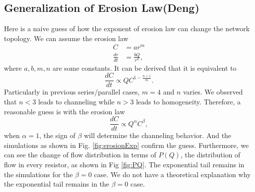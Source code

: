 \subsection{Generalization of Erosion Law(Deng)}
Here is a naive guess of how the exponent of erosion law can change the network topology. We can assume the erosion law  
\begin{align}
    C &= a r^m \\
    \frac{dr}{dt} &= \frac{b Q}{r^n},
\end{align}
where $a,b,m,n$ are some constants. It can be derived that it is equivalent to
\begin{equation}
    \frac{dC}{dt} \propto QC^{1-\frac{n+1}{m}}.
\end{equation}
Particularly in previous series/parallel cases, $m=4$ and $n$ varies. We observed that $n<3$ leads to channeling while $n>3$ leads to homogeneity. Therefore, a reasonable guess is with the erosion law 
\begin{equation}
    \frac{dC}{dt} \propto Q^\alpha C^\beta,
\end{equation}
when $\alpha = 1$, the sign of $\beta$ will determine the channeling behavior. And the simulations as shown in Fig. \ref{fig:erosionExp} confirm the guess. Furthermore, we can see the change of flow distribution in terms of $P(Q)$, the distribution of flow in every resistor, as shown in Fig \ref{fig:PQ}. The exponential tail remains in the simulations for the $\beta = 0$ case. We do not have a theoretical explanation why the exponential tail remains in the $\beta = 0$ case.
